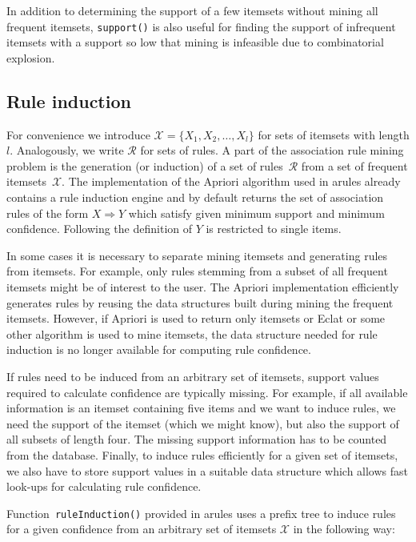 \documentclass[10pt,a4paper]{article}
\newcommand{\strong}[1]{{\normalfont\fontseries{b}\selectfont #1}}
\newcommand{\func}[1]{\mbox{\texttt{#1()}}}
\newcommand{\pkg}[1]{\strong{#1}}
\newcommand{\set}[1]{\mathcal{#1}}
\begin{document}
In addition to determining the support of a few itemsets without mining all
frequent itemsets, \func{support} is also useful for finding 
the support of infrequent itemsets with a support so low that mining
is infeasible due to combinatorial explosion.


\subsection{Rule induction\label{sec:induction}}

For convenience we introduce $\set{X} = \{X_1, X_2, \ldots, X_l\}$ for
sets of itemsets with length $l$.  Analogously, we write $\set{R}$ for
sets of rules.  A part of the association rule mining problem is the
generation (or induction) of a set of rules~$\set{R}$ from a set of
frequent itemsets~$\set{X}$.  The implementation of the Apriori
algorithm used in \pkg{arules} already contains a rule induction engine
and by default returns the set of association rules of the form $X
\Rightarrow Y$ which satisfy given minimum support and minimum
confidence.  Following the definition of
\cite{arules:Agrawal+Imielinski+Swami:1993} $Y$ is restricted to single
items.

In some cases it is necessary to separate mining itemsets and generating
rules from itemsets. For example, only rules stemming from a subset of
all frequent itemsets might be of interest to the user.  The Apriori
implementation efficiently generates rules by reusing the data
structures built during mining the frequent itemsets.  However, if
Apriori is used to return only itemsets or Eclat or some other algorithm
is used to mine itemsets, the data structure needed for rule induction
is no longer available for computing rule confidence.

If rules need to be induced from an arbitrary set of itemsets, support
values required to calculate confidence are typically missing.  For
example, if all available information is an itemset containing five
items and we want to induce rules, we need the support of the itemset
(which we might know), but also the support of all subsets of length
four. The missing support information has to be counted from the
database. Finally, to induce rules efficiently for a given set of
itemsets, we also have to store support values in a suitable data
structure which allows fast look-ups for calculating rule confidence.

Function~\func{ruleInduction} provided in \pkg{arules} 
uses a prefix tree to induce rules for a given
confidence from an arbitrary set of itemsets $\set{X}$ in the following
way:
\end{document}
